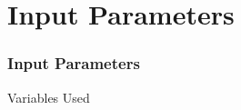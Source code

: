 \documentclass{beamer}
\providecommand{\brak}[1]{\ensuremath{\left(#1\right)}}
\theoremstyle{remark}
\providecommand{\norm}[1]{\lVert#1\rVert}
\newcommand{\myvec}[1]{\ensuremath{\begin{pmatrix}#1\end{pmatrix}}}
\let\vec\mathbf
\numberwithin{equation}{section}
\begin{document}
\section{Input Parameters}
\begin{frame}
\frametitle{Input Parameters}
\begin{table}[H]    
  \centering
  
  \caption{Variables Used}
\end{table}
\end{frame}
\end{document}
